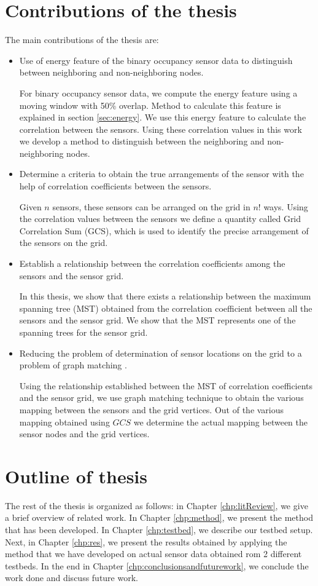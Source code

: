 \section{Contributions of the thesis}
The main contributions of the thesis are:
\begin{itemize}
\item Use of energy feature of the binary occupancy sensor data to distinguish between neighboring and non-neighboring nodes.\par
For binary occupancy sensor data, we compute the energy feature using a moving window with 50\% overlap. Method to calculate this feature is explained in section \ref{sec:energy}. We use this energy feature to calculate the correlation between the sensors.
 Using these correlation values in this work we develop a method to distinguish between the neighboring and non-neighboring nodes.
\item Determine a criteria to obtain the true arrangements of the sensor with the help of correlation coefficients between the sensors.\par
Given $n$ sensors, these sensors can be arranged on the grid in $n!$ ways. Using the correlation values between the sensors we define a quantity called Grid Correlation Sum (GCS), which is used to identify the precise arrangement of the sensors on the grid.
\item Establish a relationship between the correlation coefficients among the sensors and the sensor grid.\par
In this thesis, we show that there exists a relationship between the maximum spanning tree (MST) obtained from the correlation coefficient between all the sensors and the sensor grid. We show that the MST represents one of the spanning trees for the sensor grid.
\item Reducing the problem of determination of sensor locations  on the grid to a problem of graph matching \cite{conte2004thirty}.\par
 Using the relationship established between the MST of correlation coefficients and the sensor grid, we use graph matching technique to obtain the various mapping between the sensors and the grid vertices. Out of the various mapping obtained using $GCS$ we determine the actual mapping  between the sensor nodes and the grid vertices.
\end{itemize}

\section{Outline of thesis}

The rest of the thesis is organized as follows: in Chapter \ref{chp:litReview}, we give a brief overview of related work. In Chapter \ref{chp:method}, we present the method that has been developed. In Chapter \ref{chp:testbed}, we describe our testbed setup. Next, in Chapter \ref{chp:res}, we present the results obtained by applying the method that we have developed on actual sensor data obtained rom 2 different testbeds. In the end in Chapter \ref{chp:conclusionsandfuturework}, we conclude the work done and discuss future work.




